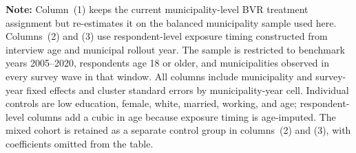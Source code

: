 
\begin{minipage}{\textwidth}
\footnotesize
\textbf{Note:} Column~(1) keeps the current municipality-level BVR treatment assignment but re-estimates it on the balanced municipality sample used here. Columns~(2) and (3) use respondent-level exposure timing constructed from interview age and municipal rollout year. The sample is restricted to benchmark years 2005--2020, respondents age 18 or older, and municipalities observed in every survey wave in that window. All columns include municipality and survey-year fixed effects and cluster standard errors by municipality-year cell. Individual controls are low education, female, white, married, working, and age; respondent-level columns add a cubic in age because exposure timing is age-imputed. The mixed cohort is retained as a separate control group in columns~(2) and (3), with coefficients omitted from the table.
\end{minipage}
